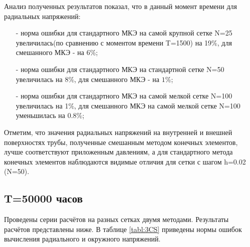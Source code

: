 \documentclass[a4paper,14pt]{extarticle}
\begin{document}
\newpage

Анализ полученных результатов показал, что в данный момент времени для радиальных напряжений:
\begin{itemize}
\item[-]норма ошибки для стандартного МКЭ на самой крупной сетке N=25 увеличилась(по сравнению с моментом времени T=1500) на 19$\%$, для смешанного МКЭ - на 6$\%$;
\item[-]норма ошибки для стандартного МКЭ на стандартной сетке N=50 увеличилась на 8$\%$, для смешанного МКЭ - на $1\%$;
\item[-]норма ошибки для стандартного МКЭ на самой мелкой сетке N=100 увеличилась на 1$\%$, для смешанного МКЭ на самой мелкой сетке N=100 уменьшилась на $0.8\%$;
\end{itemize}

Отметим, что значения радиальных напряжений на внутренней и внешней поверхностях трубы, полученные смешанным методом конечных элементов, лучше соответствуют приложенным давлениям, а для стандартного метода конечных элементов наблюдаются видимые отличия для сетки с шагом h=0.02 (N=50). 

\newpage

\subsection{T=50000 часов}

Проведены серии расчётов на разных сетках двумя методами. Результаты расчётов представлены ниже. В таблице \ref{tabl:3CS} приведены нормы ошибок вычисления радиального и окружного напряжений.
	
\end{document}
